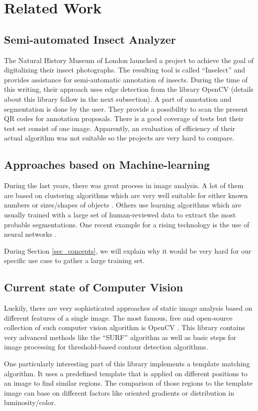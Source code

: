 %
\section{Related Work}
\label{sec_related}

\subsection{Semi-automated Insect Analyzer}

The Natural History Museum of London launched a project to achieve the goal of digitalizing their insect photographs. 
The resulting tool is called ``Inselect'' \cite{Inselect} and provides assistance for semi-automatic annotation of insects. 
During the time of this writing, their approach uses edge detection from the library OpenCV (details about this library follow in the next subsection).
A part of annotation and segmentation is done by the user. 
They provide a possibility to scan the present QR codes for annotation proposals.
There is a good coverage of tests but their test set consist of one image. 
Apparently, an evaluation of efficiency of their actual algorithm was not suitable so the projects are very hard to compare.

\subsection{Approaches based on Machine-learning}

During the last years, there was great process in image analysis. 
A lot of them are based on clustering algorithms which are very well suitable for either known numbers or sizes/shapes of objects \cite{Pappas}. 
Others use learning algorithms which are usually trained with a large set of human-reviewed data to extract the most probable segmentations.
One recent example for a rising technology is the use of neural networks \cite{turagal}.

During Section \ref{sec_concepts}, we will explain why it would be very hard for our specific use case to gather a large training set.

\subsection{Current state of Computer Vision}

Luckily, there are very sophisticated approaches of static image analysis based on different features of a single image.
The most famous, free and open-source collection of such computer vision algorithm is OpenCV \cite{opencv_library}. 
This library contains very advanced methods like the ``SURF'' algorithm as well as basic steps for image processing for threshold-based contour detection algorithms.

One particularly interesting part of this library implements a template matching algorithm. 
It uses a predefined template that is applied on different positions to an image to find similar regions.
The comparison of those regions to the template image can base on different factors like oriented gradients or distribution in luminosity/color.